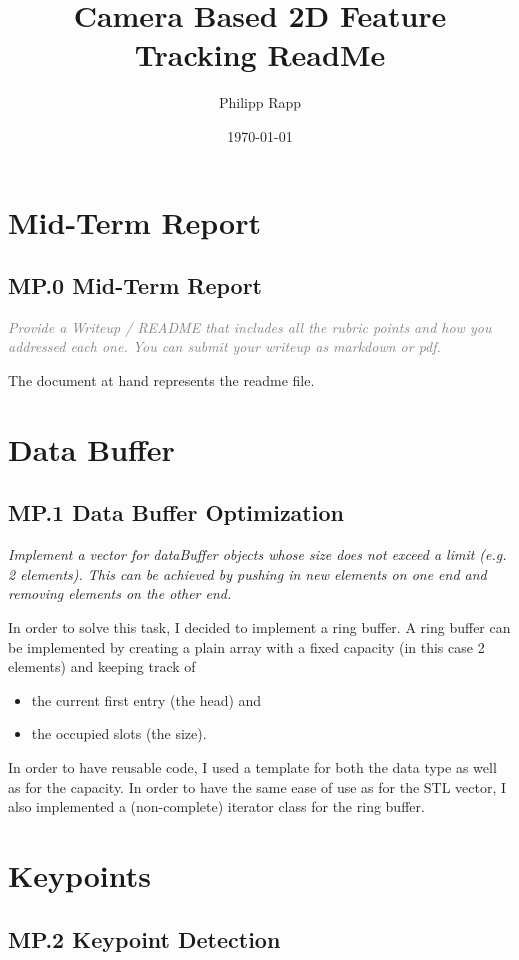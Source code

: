 \documentclass[a4paper]{scrartcl}
\title{Camera Based 2D Feature Tracking ReadMe}
\author{Philipp Rapp}
\date{\today}
\begin{document}
\maketitle

\section*{Mid-Term Report}
\subsection*{MP.0 Mid-Term Report}
\textcolor{gray}{\textit{Provide a Writeup / README that includes all the rubric points and how you addressed each one. You can submit your writeup as markdown or pdf.}}

The document at hand represents the readme file.

\section*{Data Buffer}
\subsection*{MP.1 Data Buffer Optimization}
\textit{Implement a vector for dataBuffer objects whose size does not exceed a limit (e.g. 2 elements). This can be achieved by pushing in new elements on one end and removing elements on the other end.}

In order to solve this task, I decided to implement a ring buffer.
A ring buffer can be implemented by creating a plain array with a fixed capacity (in this case 2 elements)
and keeping track of
\begin{itemize}
	\item the current first entry (the head) and
	\item the occupied slots (the size).
\end{itemize}
In order to have reusable code, I used a template for both the data type as well as
for the capacity.
In order to have the same ease of use as for the STL vector, I also implemented a (non-complete)
iterator class for the ring buffer.

\section*{Keypoints}
\subsection*{MP.2 Keypoint Detection}
\end{document}
